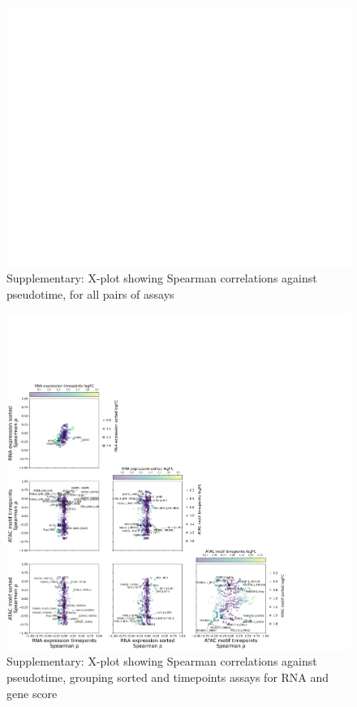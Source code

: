 \documentclass[a4paper]{article}
\begin{document}
\begin{figure}[!htb]
  \centering
  \includegraphics[width=\textwidth]{../figures/hematopoiesis/Basophil_40_109_smooth_none_detailed_X_plot.png}
  \caption{Supplementary: X-plot showing Spearman correlations against pseudotime, for all pairs of assays}
\end{figure}

\begin{figure}[!htb]
  \centering
  \includegraphics[width=\textwidth]{../figures/hematopoiesis/Basophil_40_109_smooth_none_semi_detailed_X_plot.png}
  \caption{Supplementary: X-plot showing Spearman correlations against pseudotime, grouping sorted and timepoints assays for RNA and gene score}
\end{figure}
\end{document}
